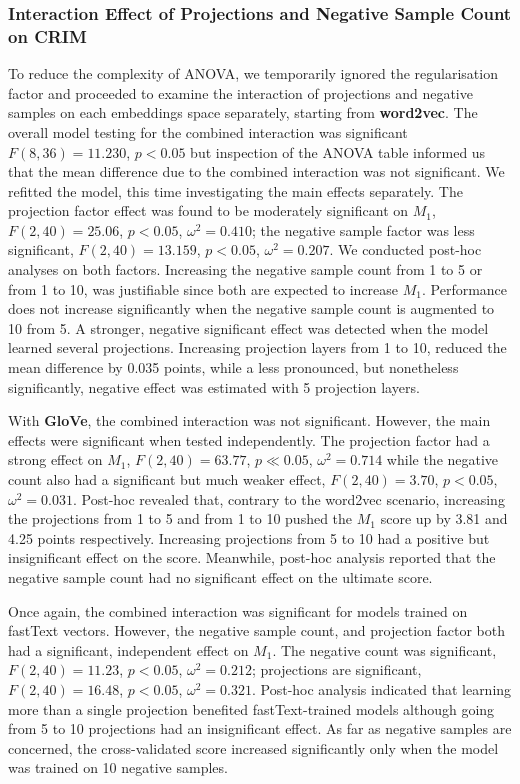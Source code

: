 \subsubsection{Interaction Effect of Projections and Negative Sample Count on CRIM}
To reduce the complexity of \ac{ANOVA}, we temporarily ignored the regularisation factor and proceeded to examine the interaction of projections and negative samples on each embeddings space separately, starting from \textbf{word2vec}.  The overall model testing for the combined interaction was significant $F(8, 36)= 11.230$, $p<0.05$ but inspection of the \ac{ANOVA} table informed us that the mean difference due to the combined interaction was not significant.  We refitted the model, this time investigating the main effects separately.  The projection factor effect was found to be moderately significant on $M_1$, $F(2,40)=25.06$, $p < 0.05$, $\omega^2=0.410$; the negative sample factor was less significant, $F(2,40)=13.159$, $p < 0.05$, $\omega^2 = 0.207$.  We conducted post-hoc analyses on both factors. Increasing the negative sample count from 1 to 5 or from 1 to 10, was justifiable since both are expected to increase $M_1$. Performance does not increase significantly when the negative sample count is augmented to 10 from 5.  A stronger, negative significant effect was detected when the model learned several projections.  Increasing projection layers from 1 to 10, reduced the mean difference by 0.035 points, while a less pronounced, but nonetheless significantly, negative effect was estimated with 5 projection layers.

With \textbf{GloVe}, the combined interaction was not significant. However, the main effects were significant when tested independently.  The projection factor had a strong effect on $M_1$, $F(2,40) = 63.77$, $p \ll 0.05$, $\omega^2=0.714$ while the negative count also had a significant but much weaker effect, $F(2,40) = 3.70$, $p < 0.05$, $\omega^2 = 0.031$.  Post-hoc revealed that, contrary to the word2vec scenario, increasing the projections from 1 to 5 and from 1 to 10 pushed the $M_1$ score up by 3.81 and 4.25 points respectively.  Increasing projections from 5 to 10 had a positive but insignificant effect on the score.  Meanwhile, post-hoc analysis reported that the negative sample count had no significant effect on the ultimate score.

Once again, the combined interaction was significant for models trained on fastText vectors.  However, the negative sample count, and projection factor both had a significant, independent effect on $M_1$.  The negative count was significant, $F(2,40)=11.23$, $p < 0.05$, $\omega^2 = 0.212$; projections are significant, $F(2,40)=16.48$, $p < 0.05$, $\omega^2 = 0.321$.  Post-hoc analysis indicated that learning more than a single projection benefited fastText-trained models although going from 5 to 10 projections had an insignificant effect.  As far as negative samples are concerned, the cross-validated score increased significantly only when the model was trained on 10 negative samples.

